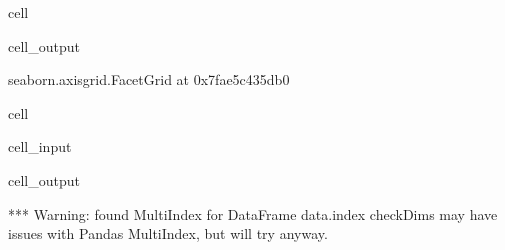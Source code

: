 \documentclass[letterpaper,table,10pt,english]{jupyterBook}
\begin{document}
\begin{sphinxuseclass}{cell}
\begin{sphinxVerbatimOutput}
\begin{sphinxuseclass}{cell_output}
\begin{sphinxVerbatim}[commandchars=\\\{\}]
\PYGZlt{}seaborn.axisgrid.FacetGrid at 0x7fae5c435db0\PYGZgt{}
\end{sphinxVerbatim}

\noindent{}

\end{sphinxuseclass}\end{sphinxVerbatimOutput}

\end{sphinxuseclass}
\begin{sphinxuseclass}{cell}\begin{sphinxVerbatimInput}

\begin{sphinxuseclass}{cell_input}
\begin{sphinxVerbatim}[commandchars=\\\{\}]
   
       
                      
\end{sphinxVerbatim}

\end{sphinxuseclass}\end{sphinxVerbatimInput}
\begin{sphinxVerbatimOutput}

\begin{sphinxuseclass}{cell_output}
\begin{sphinxVerbatim}[commandchars=\\\{\}]
*** Warning: found MultiIndex for DataFrame data.index \PYGZhy{} checkDims may have issues with Pandas MultiIndex, but will try anyway.
\end{sphinxVerbatim}


\end{sphinxuseclass}
\end{sphinxVerbatimOutput}
\end{sphinxuseclass}
\end{document}
